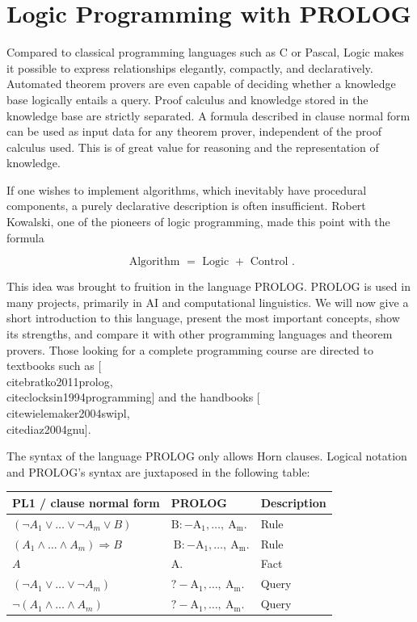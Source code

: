 \documentclass[10pt]{book}
\begin{document}
\chapter{Logic Programming with PROLOG}

Compared to classical programming languages such as C or Pascal, Logic makes it possible to express relationships elegantly, compactly, and declaratively. Automated theorem provers are even capable of deciding whether a knowledge base logically entails a query. Proof calculus and knowledge stored in the knowledge base are strictly separated. A formula described in clause normal form can be used as input data for any theorem prover, independent of the proof calculus used. This is of great value for reasoning and the representation of knowledge.

If one wishes to implement algorithms, which inevitably have procedural components, a purely declarative description is often insufficient. Robert Kowalski, one of the pioneers of logic programming, made this point with the formula

$$
\text { Algorithm }=\text { Logic }+ \text { Control } .
$$

This idea was brought to fruition in the language PROLOG. PROLOG is used in many projects, primarily in AI and computational linguistics. We will now give a short introduction to this language, present the most important concepts, show its strengths, and compare it with other programming languages and theorem provers. Those looking for a complete programming course are directed to textbooks such as [\\cite{bratko2011prolog}, \\cite{clocksin1994programming}] and the handbooks [\\cite{wielemaker2004swipl}, \\cite{diaz2004gnu}].

The syntax of the language PROLOG only allows Horn clauses. Logical notation and PROLOG's syntax are juxtaposed in the following table:

\begin{center}
\begin{tabular}{lll}
\hline
PL1 / clause normal form & PROLOG & Description \\
\hline
$\left(\neg A_{1} \vee \ldots \vee \neg A_{m} \vee B\right)$ & $\mathrm{B}:-\mathrm{A}_{1}, \ldots, \mathrm{~A}_{\mathrm{m}}$. & Rule \\
\hline
$\left(A_{1} \wedge \ldots \wedge A_{m}\right) \Rightarrow B$ & $\mathrm{~B}:-\mathrm{A}_{1}, \ldots, \mathrm{~A}_{\mathrm{m}}$. & Rule \\
\hline
$A$ & A. & Fact \\
\hline
$\left(\neg A_{1} \vee \ldots \vee \neg A_{m}\right)$ & $?-\mathrm{A}_{1}, \ldots, \mathrm{~A}_{\mathrm{m}}$. & Query \\
\hline
$\neg\left(A_{1} \wedge \ldots \wedge A_{m}\right)$ & $?-\mathrm{A}_{1}, \ldots, \mathrm{~A}_{\mathrm{m}}$. & Query \\
\hline
\end{tabular}
\end{center}
\end{document}
